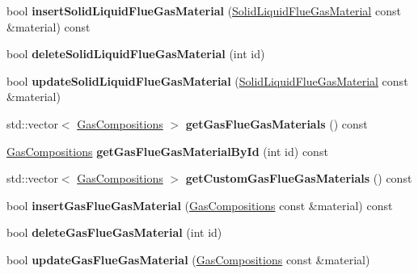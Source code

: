 \begin{DoxyCompactItemize}
\item 
\mbox{\label{class_s_q_lite_aa1de7450c37a07dfd0541fdf0dc164ef}} 
bool {\bfseries insert\+Solid\+Liquid\+Flue\+Gas\+Material} (\hyperlink{class_solid_liquid_flue_gas_material}{Solid\+Liquid\+Flue\+Gas\+Material} const \&material) const
\item 
\mbox{\label{class_s_q_lite_ac83353062d75af65c5b01d55570d0ead}} 
bool {\bfseries delete\+Solid\+Liquid\+Flue\+Gas\+Material} (int id)
\item 
\mbox{\label{class_s_q_lite_aed13c3aeeef3fdf7f3b2d72b61dd93e8}} 
bool {\bfseries update\+Solid\+Liquid\+Flue\+Gas\+Material} (\hyperlink{class_solid_liquid_flue_gas_material}{Solid\+Liquid\+Flue\+Gas\+Material} const \&material)
\item 
\mbox{\label{class_s_q_lite_a7f054c9a3a3954277c5de8d4048a40f9}} 
std\+::vector$<$ \hyperlink{class_gas_compositions}{Gas\+Compositions} $>$ {\bfseries get\+Gas\+Flue\+Gas\+Materials} () const
\item 
\mbox{\label{class_s_q_lite_a230049a94b9e2ff84d19fcd5a087954c}} 
\hyperlink{class_gas_compositions}{Gas\+Compositions} {\bfseries get\+Gas\+Flue\+Gas\+Material\+By\+Id} (int id) const
\item 
\mbox{\label{class_s_q_lite_a8cd9d62714f1083bab16e388dabc59be}} 
std\+::vector$<$ \hyperlink{class_gas_compositions}{Gas\+Compositions} $>$ {\bfseries get\+Custom\+Gas\+Flue\+Gas\+Materials} () const
\item 
\mbox{\label{class_s_q_lite_a95d5521ed0de19c979ac9627ae21fbcd}} 
bool {\bfseries insert\+Gas\+Flue\+Gas\+Material} (\hyperlink{class_gas_compositions}{Gas\+Compositions} const \&material) const
\item 
\mbox{\label{class_s_q_lite_a12b38db00e6d8bcff8345e7300a67b26}} 
bool {\bfseries delete\+Gas\+Flue\+Gas\+Material} (int id)
\item 
\mbox{\label{class_s_q_lite_a71c1973e285ccae25b7bb8dbc101770e}} 
bool {\bfseries update\+Gas\+Flue\+Gas\+Material} (\hyperlink{class_gas_compositions}{Gas\+Compositions} const \&material)

\end{DoxyCompactItemize}
